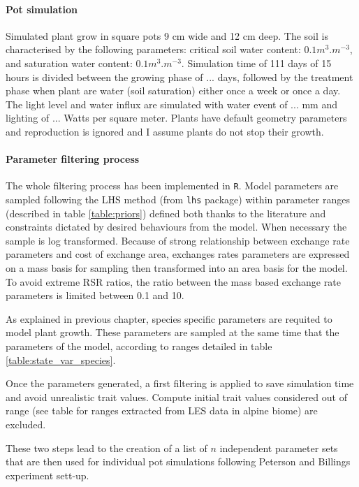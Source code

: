 \paragraph{Pot simulation}
Simulated plant grow in square pots 9 cm wide and 12 cm deep. The soil is characterised by the following parameters: critical soil water content: $0.1 m^3.m^{-3}$, and saturation water content: $0.1 m^3.m^{-3}$. Simulation time of 111 days of 15 hours is divided between the growing phase of ... days, followed by the treatment phase when plant are water (soil saturation) either once a week or once a day. The light level and water influx are simulated with water event of ... mm and lighting of ... Watts per square meter.
Plants have default geometry parameters and reproduction is ignored and I assume plants do not stop their growth.

\paragraph{Parameter filtering process}
The whole filtering process has been implemented in \texttt{R}. Model parameters are sampled following the LHS method (from \texttt{lhs} package) within parameter ranges (described in table \ref{table:priors}) defined both thanks to the literature and constraints dictated by desired behaviours from the model. When necessary the sample is log transformed. Because of strong relationship between exchange rate parameters and cost of exchange area, exchanges rates parameters are expressed on a mass basis for sampling then transformed into an area basis for the model. To avoid extreme RSR ratios, the ratio between the mass based exchange rate parameters is limited between 0.1 and 10.

As explained in previous chapter, species specific parameters are requited to model plant growth. These parameters are sampled at the same time that the parameters of the model, according to ranges detailed in table \ref{table:state_var_species}.

Once the parameters generated, a first filtering is applied to save simulation time and avoid unrealistic trait values. Compute initial trait values considered out of range (see table for ranges extracted from LES data \parencite{wright_worldwide_2004} in alpine biome) are excluded.

These two steps lead to the creation of a list of $n$ independent parameter sets that are then used for individual pot simulations following Peterson and Billings experiment sett-up.

